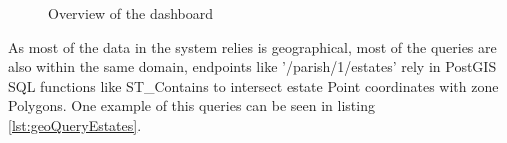 \begin{figure}[!t]
    \centering
    \caption{Overview of the dashboard} 
    \label{fig:overviewDashboard}
\end{figure}

As most of the data in the system relies is geographical, most of the queries are also within the same domain, endpoints like '/parish/1/estates' rely in PostGIS SQL functions like ST\_Contains to intersect estate Point coordinates with zone Polygons. One example of this queries can be seen in listing \ref{lst:geoQueryEstates}.

